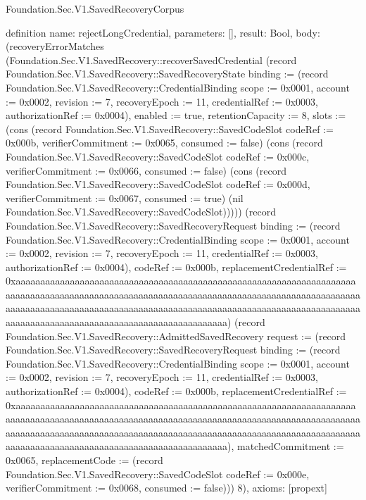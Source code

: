 \begin{lexlean}{Foundation.Sec.V1.SavedRecoveryCorpus}
\begin{semanticmodule}
definition{
  name: rejectLongCredential,
  parameters: [],
  result: Bool,
  body: (recoveryErrorMatches (Foundation.Sec.V1.SavedRecovery::recoverSavedCredential (record Foundation.Sec.V1.SavedRecovery::SavedRecoveryState {binding := (record Foundation.Sec.V1.SavedRecovery::CredentialBinding {scope := 0x0001, account := 0x0002, revision := 7, recoveryEpoch := 11, credentialRef := 0x0003, authorizationRef := 0x0004}), enabled := true, retentionCapacity := 8, slots := (cons (record Foundation.Sec.V1.SavedRecovery::SavedCodeSlot {codeRef := 0x000b, verifierCommitment := 0x0065, consumed := false}) (cons (record Foundation.Sec.V1.SavedRecovery::SavedCodeSlot {codeRef := 0x000c, verifierCommitment := 0x0066, consumed := false}) (cons (record Foundation.Sec.V1.SavedRecovery::SavedCodeSlot {codeRef := 0x000d, verifierCommitment := 0x0067, consumed := true}) (nil Foundation.Sec.V1.SavedRecovery::SavedCodeSlot))))}) (record Foundation.Sec.V1.SavedRecovery::SavedRecoveryRequest {binding := (record Foundation.Sec.V1.SavedRecovery::CredentialBinding {scope := 0x0001, account := 0x0002, revision := 7, recoveryEpoch := 11, credentialRef := 0x0003, authorizationRef := 0x0004}), codeRef := 0x000b, replacementCredentialRef := 0xaaaaaaaaaaaaaaaaaaaaaaaaaaaaaaaaaaaaaaaaaaaaaaaaaaaaaaaaaaaaaaaaaaaaaaaaaaaaaaaaaaaaaaaaaaaaaaaaaaaaaaaaaaaaaaaaaaaaaaaaaaaaaaaaaaaaaaaaaaaaaaaaaaaaaaaaaaaaaaaaaaaaaaaaaaaaaaaaaaaaaaaaaaaaaaaaaaaaaaaaaaaaaaaaaaaaaaaaaaaaaaaaaaaaaaaaaaaaaaaaaaaaaaaaaaaaaaaaaa}) (record Foundation.Sec.V1.SavedRecovery::AdmittedSavedRecovery {request := (record Foundation.Sec.V1.SavedRecovery::SavedRecoveryRequest {binding := (record Foundation.Sec.V1.SavedRecovery::CredentialBinding {scope := 0x0001, account := 0x0002, revision := 7, recoveryEpoch := 11, credentialRef := 0x0003, authorizationRef := 0x0004}), codeRef := 0x000b, replacementCredentialRef := 0xaaaaaaaaaaaaaaaaaaaaaaaaaaaaaaaaaaaaaaaaaaaaaaaaaaaaaaaaaaaaaaaaaaaaaaaaaaaaaaaaaaaaaaaaaaaaaaaaaaaaaaaaaaaaaaaaaaaaaaaaaaaaaaaaaaaaaaaaaaaaaaaaaaaaaaaaaaaaaaaaaaaaaaaaaaaaaaaaaaaaaaaaaaaaaaaaaaaaaaaaaaaaaaaaaaaaaaaaaaaaaaaaaaaaaaaaaaaaaaaaaaaaaaaaaaaaaaaaaa}), matchedCommitment := 0x0065, replacementCode := (record Foundation.Sec.V1.SavedRecovery::SavedCodeSlot {codeRef := 0x000e, verifierCommitment := 0x0068, consumed := false})})) 8),
  axioms: [propext]
}


\end{semanticmodule}
\end{lexlean}

